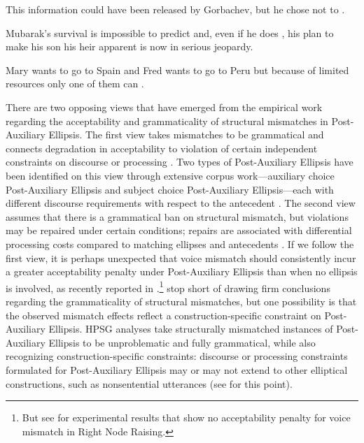 \ealnoraggedright

\ex This information could have been released by Gorbachev, but he chose not to \jbtr. \citep[37]{Hardt1993} \label{27}

\ex Mubarak's survival is impossible to predict and, even if he does \jbtr, his plan to make his son his heir apparent is now in serious jeopardy. \citep[7]{Miller2014a} \label{28}

\ex Mary wants to go to Spain and Fred wants to go to Peru but because of limited resources only one of them can \jbtr. \citep[128]{Webber79a} \label{29}
\zl

There are two opposing views that have emerged from the empirical work regarding the acceptability and grammaticality of structural mismatches in Post-Auxiliary Ellipsis. The first view takes mismatches to be grammatical and connects degradation in acceptability to violation of certain independent constraints on discourse \citep{Kehler2002, Miller2011, %
Miller2014, Miller2014a, Miller2014b} or processing \citep{Kim2011}. Two types of Post-Auxiliary Ellipsis have been identified on this view through extensive corpus work---auxiliary choice Post-Auxiliary Ellipsis and subject choice Post-Auxiliary Ellipsis---each with different discourse requirements with respect to the antecedent \citep{Miller2011, Miller2014a, Miller2014b}. The second view assumes that there is a grammatical ban on structural mismatch, but violations may be repaired under certain conditions; repairs are associated with differential processing costs compared to matching ellipses and antecedents \citep{Arregui2006, Grant2012}. If we follow the first view, it is perhaps unexpected that voice mismatch should consistently incur a greater acceptability penalty under Post-Auxiliary Ellipsis than when no ellipsis is involved, as recently reported in \citet{Kim2018}.\footnote{But see \citet{Abeille2016} for experimental results
that show no acceptability penalty for voice mismatch in  Right Node Raising.} \citet{Kim2018} stop short of drawing firm conclusions regarding the grammaticality of structural mismatches, but one possibility is that the observed mismatch effects reflect a construction-specific constraint on Post-Auxiliary Ellipsis. HPSG analyses take structurally mismatched instances of Post-Auxiliary Ellipsis to be unproblematic and fully grammatical, while also recognizing construction-specific constraints: discourse or processing constraints formulated for Post-Auxiliary Ellipsis may or may not extend to other elliptical constructions, such as nonsentential utterances (see \citealt{Abeille2016,Ginzburg2018} for this point).


